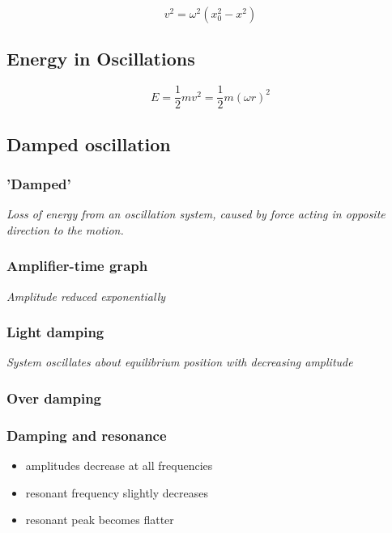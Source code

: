 \documentclass[a4paper,9pt]{scrartcl}
\begin{document}
    \begin{displaymath}
        v^2 = \omega^2(x_0^2 - x^2)
    \end{displaymath}

    \subsection{Energy in Oscillations}
    \begin{displaymath}
        E = \frac{1}{2}mv^2 = \frac{1}{2}m({\omega}r)^2
    \end{displaymath}

    \subsection{Damped oscillation}

    \subsubsection{'Damped'}
    \textit{Loss of energy from an oscillation system, caused by force acting in opposite direction to the motion.}

    \subsubsection{Amplifier-time graph}
    \textit{Amplitude reduced exponentially}

    \subsubsection{Light damping}
    \textit{System oscillates about equilibrium position with decreasing amplitude}

    \subsubsection{Over damping}

    \subsubsection{Damping and resonance}
    \begin{itemize}
        \item amplitudes decrease at all frequencies
        \item resonant frequency slightly decreases
        \item resonant peak becomes flatter
    \end{itemize}
\end{document}

